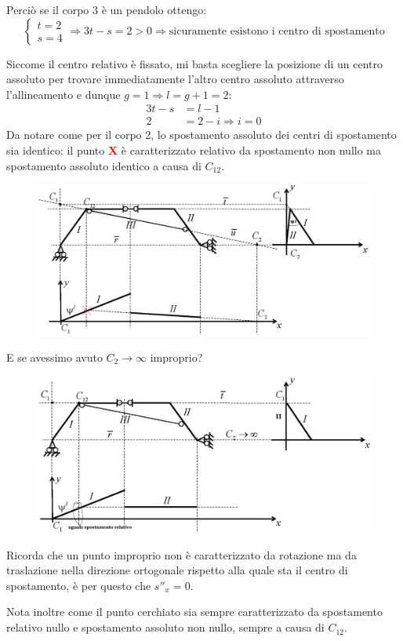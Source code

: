 \documentclass{article}
\begin{document}
\begin{adjustwidth}{2in}{}
Perciò se il corpo 3 è un pendolo ottengo: 
\[
\begin{cases}
	t = 2\\
	s = 4
\end{cases} \Rightarrow 3t - s = 2 > 0 \Rightarrow \text{sicuramente esistono i centro di spostamento}
\]

Siccome il centro relativo è fissato, mi basta scegliere la posizione di un centro assoluto per trovare immediatamente l'altro centro assoluto attraverso l'allineamento e dunque $g = 1 \Rightarrow l = g+ 1 = 2$: 
\[
\begin{split}
	3t - s & = l-1 \\
	2 & = 2-i \Rightarrow i = 0
	\end{split}
\]
Da notare come per il corpo 2, lo spostamento assoluto dei centri di spostamento sia identico: il punto \textcolor{red}{\textbf{X}} è caratterizzato relativo da spostamento non nullo ma spostamento assoluto identico a causa di $C_{12}$.
\begin{figure}[H]
	\centering
	\includegraphics[width=0.5\linewidth]{immagini/1.PARTE4_Pagina_15}
\end{figure}

	E se avessimo avuto $C_2\rightarrow\infty$ improprio? 

\begin{figure}[H]
	\centering
	\includegraphics[width=0.5\linewidth]{immagini/1.PARTE4_Pagina_16}
\end{figure}

	Ricorda che un punto improprio non è caratterizzato da rotazione ma da traslazione nella direzione ortogonale rispetto alla quale sta il centro di spostamento, è per questo che $s''_x = 0$.
	
	Nota inoltre come il punto cerchiato sia sempre caratterizzato da spostamento relativo nullo e spostamento assoluto non nullo, sempre a causa di $C_{12}$.\newline 


\end{adjustwidth}
\end{document}
